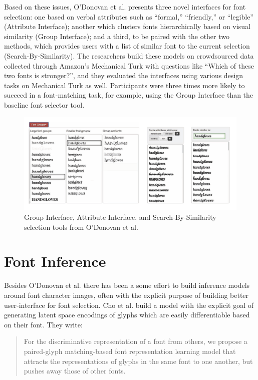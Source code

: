 Based on these issues, O'Donovan et al. presents three novel interfaces for font selection: one based on verbal attributes such as ``formal,'' ``friendly,'' or ``legible'' (Attribute Interface); another which clusters fonts hierarchically based on visual similarity (Group Interface); and a third, to be paired with the other two methods, which provides users with a list of similar font to the current selection (Search-By-Similarity). The researchers build these models on crowdsourced data collected through Amazon's Mechanical Turk with questions like ``Which of these two fonts is stronger?'', and they evaluated the interfaces using various design tasks on Mechanical Turk as well. Participants were three times more likely to succeed in a font-matching task, for example, using the Group Interface than the baseline font selector tool.

\begin{figure}[h]
    \centering
    \includegraphics[width=1\textwidth]{images/odonovan-interfaces.png}
    \caption{Group Interface, Attribute Interface, and Search-By-Similarity selection tools from O'Donovan et al.}
    \label{fig:odonovan-interfaces}
\end{figure}

\section{Font Inference}

Besides O'Donovan et al. there has been a some effort to build inference models around font character images, often with the explicit purpose of building better user-interface for font selection. Cho et al. build a model with the explicit goal of generating latent space encodings of glyphs which are easily differentiable based on their font. They write:

\begin{quote}

For the discriminative representation of a font from others, we propose a paired-glyph
matching-based font representation learning model that attracts the representations of
glyphs in the same font to one another, but pushes away those of other fonts. \cite{cho2022}
	
\end{quote}

